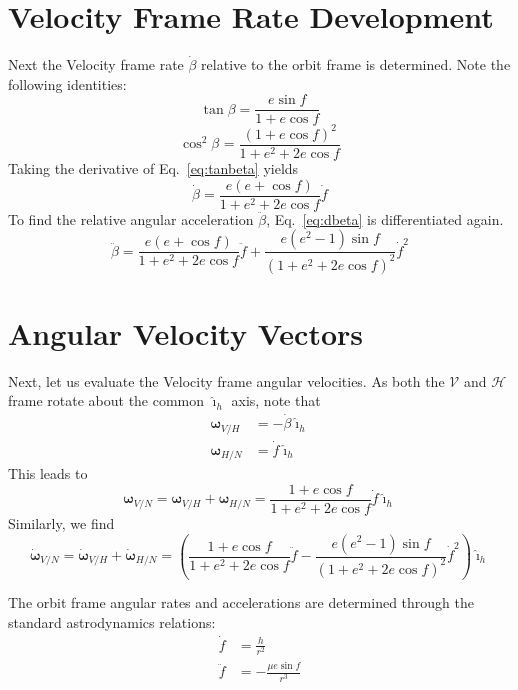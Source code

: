 \documentclass[]{AVSSimReportMemo}
\begin{document}
\section{Velocity Frame Rate Development}
Next the Velocity frame rate $\dot\beta$ relative to the orbit frame is determined.
Note the following identities:
\begin{equation}
  \label{eq:tanbeta}
  \tan\beta = \frac{e \sin f}{1 + e \cos f}
\end{equation}
\begin{equation}
  \label{eq:cos2beta}
  \cos^{2}\beta^{} = \frac{(1+e \cos f)^{2}}{1+e^{2}+2 e \cos f}
\end{equation}
Taking the derivative of Eq.~\eqref{eq:tanbeta} yields
\begin{equation}
  \label{eq:dbeta}
  \dot\beta =   \frac{ e (e+\cos f)}{1+e^{2}+2 e \cos f} \dot f
\end{equation}
To find the relative angular acceleration $\ddot\beta$, Eq.~\eqref{eq:dbeta} is differentiated again.
\begin{equation}
  \label{eq:ddbeta}
  \ddot\beta = 
   \frac{e(e+\cos f)}{1+e^{2}+2 e \cos f} \ddot f
   +\frac{
  e  (e^{2}-1)\sin f
  }{
  (1+e^{2}+2 e \cos f)^{2}
  } \dot f^{2}
\end{equation}


\section{Angular Velocity Vectors}
Next, let us evaluate the Velocity frame angular velocities.  As both the $\mathcal{V}$ and $\mathcal{H}$ frame rotate about the common $\hat{\bm\imath}_{h}$ axis, note that
\begin{align}
  \bm\omega_{V/H} &= -\dot\beta \hat{\bm\imath}_{h}
  \\
  \bm\omega_{H/N} &= \dot f \hat{\bm\imath}_{h}
\end{align}
This leads to
\begin{equation}
  \label{eq:omegaVN}
  \bm\omega_{V/N} = \bm\omega_{V/H} + \bm\omega_{H/N} = 
  \frac{1+e \cos f}{1+e^{2} + 2 e \cos f} \dot f \hat{\bm\imath}_{h}
\end{equation}
Similarly, we find
\begin{equation}
  \label{eq:domegaVN}
  \dot{\bm\omega}_{V/N} = \dot{\bm\omega}_{V/H} + \dot{\bm\omega}_{H/N} = 
  \left( \frac{1+e\cos f}{1+e^{2}+2 e \cos f} \ddot f
  - \frac{
  e  (e^{2}-1)\sin f
  }{
  (1+e^{2}+2 e \cos f)^{2}
  } \dot f^{2} \right) \hat{\bm\imath}_{h}
\end{equation}

The orbit frame angular rates and accelerations are determined through the standard astrodynamics relations:
\begin{align}
  \dot f &= \frac{h}{r^{2}}
  \\
  \ddot f &= - \frac{\mu e \sin f}{r^{3}}
\end{align}




\end{document}
